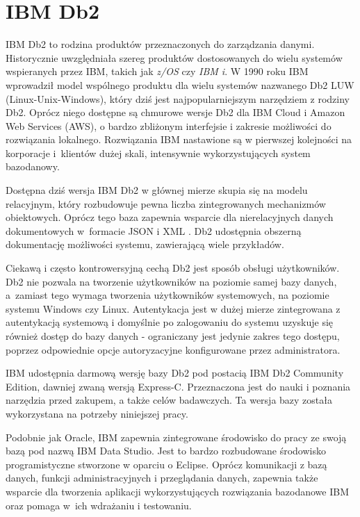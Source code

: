 \documentclass[a4paper,twoside,12pt]{book}
\begin{document}
\section{IBM Db2}

IBM Db2 to rodzina produktów przeznaczonych do zarządzania danymi. Historycznie uwzględniała szereg produktów dostosowanych do wielu systemów wspieranych przez IBM, takich jak \textit{z/OS} czy \textit{IBM i}. W 1990 roku IBM wprowadził model wspólnego produktu dla wielu systemów nazwanego Db2 LUW (Linux-Unix-Windows), który dziś jest najpopularniejszym narzędziem z rodziny Db2. Oprócz niego dostępne są chmurowe wersje Db2 dla IBM Cloud i Amazon Web Services (AWS), o bardzo zbliżonym interfejsie i zakresie możliwości do rozwiązania lokalnego. Rozwiązania IBM nastawione są w pierwszej kolejności na korporacje i~klientów dużej skali, intensywnie wykorzystujących system bazodanowy. 

Dostępna dziś wersja IBM Db2 w głównej mierze skupia się na modelu relacyjnym, który rozbudowuje pewna liczba zintegrowanych mechanizmów obiektowych. Oprócz tego baza zapewnia wsparcie dla nierelacyjnych danych dokumentowych w~formacie JSON i XML \cite{bib:db2-book}. Db2 udostępnia obszerną dokumentację możliwości systemu, zawierającą wiele przykładów.

Ciekawą i często kontrowersyjną cechą Db2 jest sposób obsługi użytkowników. Db2 nie pozwala na tworzenie użytkowników na poziomie samej bazy danych, a~zamiast tego wymaga tworzenia użytkowników systemowych, na poziomie systemu Windows czy Linux. Autentykacja jest w dużej mierze zintegrowana z autentykacją systemową i domyślnie po zalogowaniu do systemu uzyskuje się również dostęp do bazy danych - ograniczany jest jedynie zakres tego dostępu, poprzez odpowiednie opcje autoryzacyjne konfigurowane przez administratora.

IBM udostępnia darmową wersję bazy Db2 pod postacią IBM Db2 Community Edition, dawniej zwaną wersją Express-C. Przeznaczona jest do nauki i poznania narzędzia przed zakupem, a także celów badawczych. Ta wersja bazy została wykorzystana na potrzeby niniejszej pracy.

Podobnie jak Oracle, IBM zapewnia zintegrowane środowisko do pracy ze swoją bazą pod nazwą IBM Data Studio. Jest to bardzo rozbudowane środowisko programistyczne stworzone w oparciu o Eclipse. Oprócz komunikacji z bazą danych, funkcji administracyjnych i przeglądania danych, zapewnia także wsparcie dla tworzenia aplikacji wykorzystujących rozwiązania bazodanowe IBM oraz pomaga w~ich wdrażaniu i testowaniu.
\end{document}
